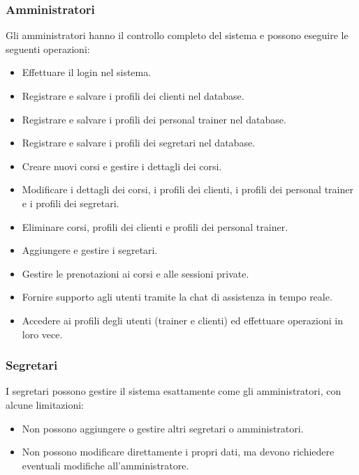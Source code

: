 \documentclass{report}
\begin{document}
\subsubsection{Amministratori}
\par Gli amministratori hanno il controllo completo del sistema e possono eseguire le seguenti operazioni:
\begin{itemize}
    \item Effettuare il login nel sistema.
    \item Registrare e salvare i profili dei clienti nel database.
    \item Registrare e salvare i profili dei personal trainer nel database.
    \item Registrare e salvare i profili dei segretari nel database.
    \item Creare nuovi corsi e gestire i dettagli dei corsi.
    \item Modificare i dettagli dei corsi, i profili dei clienti, i profili dei personal trainer e i profili dei segretari.
    \item Eliminare corsi, profili dei clienti e profili dei personal trainer.
    \item Aggiungere e gestire i segretari.
    \item Gestire le prenotazioni ai corsi e alle sessioni private.
    \item Fornire supporto agli utenti tramite la chat di assistenza in tempo reale.
    \item Accedere ai profili degli utenti (trainer e clienti) ed effettuare operazioni in loro vece.
\end{itemize}
\subsubsection{Segretari}
\par I segretari possono gestire il sistema esattamente come gli amministratori, con alcune limitazioni:
\begin{itemize}
    \item Non possono aggiungere o gestire altri segretari o amministratori.
    \item Non possono modificare direttamente i propri dati, ma devono richiedere eventuali modifiche all'amministratore.
\end{itemize}
\end{document}
